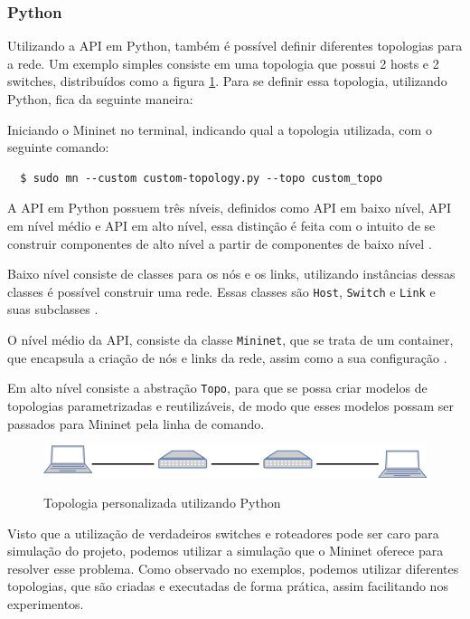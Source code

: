 \documentclass[12pt,
openright, 
oneside,
a4paper,
brazil]{facom-ufu-abntex2}
\theoremstyle{definition}
\begin{document}
\subsubsection{Python}
Utilizando a API em Python, também é possível definir diferentes topologias para a rede. Um
exemplo simples consiste em uma topologia que possui 2 hosts e 2 switches, distribuídos como
a figura \ref{fig:custom-topology-example}. Para se definir essa topologia, utilizando
Python, fica da seguinte maneira:



Iniciando o Mininet no terminal, indicando qual a topologia utilizada, com o seguinte comando:

\begin{verbatim}
  $ sudo mn --custom custom-topology.py --topo custom_topo
\end{verbatim}

A API em Python possuem três níveis, definidos como API em baixo nível, API em nível médio e API
em alto nível, essa distinção é feita com o intuito de se construir componentes de alto nível
a partir de componentes de baixo nível \citep{mininetDocs}.

Baixo nível consiste de classes para os nós e os links, utilizando instâncias dessas 
classes é possível construir uma rede. Essas classes são \texttt{Host}, \texttt{Switch} e
\texttt{Link} e suas subclasses \citep{mininetDocs}.

O nível médio da API, consiste da classe \texttt{Mininet}, que se trata de um container,
que encapsula a criação de nós e links da rede, assim como a sua configuração \citep{mininetDocs}.

Em alto nível consiste a abstração \texttt{Topo}, para que se possa criar modelos de topologias 
parametrizadas e reutilizáveis, de modo que esses modelos possam ser passados para Mininet
pela linha de comando.

\begin{figure}[h]
    \caption{Topologia personalizada utilizando Python}
    \centering
    \includegraphics[width=\textwidth]{images/2sw-2host.png}
    \label{fig:custom-topology-example}
\end{figure}

Visto que a utilização de verdadeiros switches e roteadores pode ser caro para simulação do
projeto, podemos utilizar a simulação que o Mininet oferece para resolver esse problema.
Como observado no exemplos, podemos utilizar diferentes topologias, que são criadas e 
executadas de forma prática, assim facilitando nos experimentos.
\end{document}
